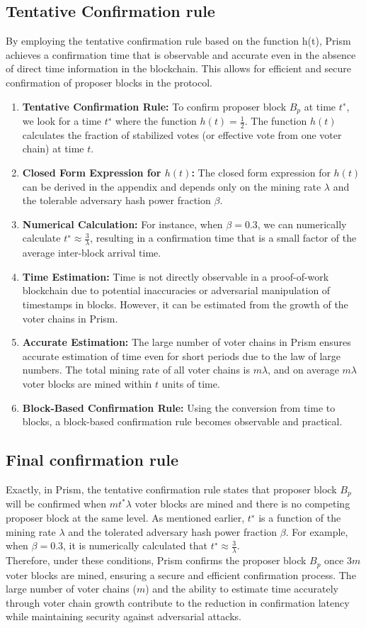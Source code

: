 \documentclass{report}
\begin{document}
\subsection{Tentative Confirmation rule}
By employing the tentative confirmation rule based on the function h(t), Prism achieves a confirmation time that is observable and accurate even in the absence of direct time information in the blockchain. This allows for efficient and secure confirmation of proposer blocks in the protocol.\\
\begin{enumerate}
	\item \textbf{Tentative Confirmation Rule:}  To confirm proposer block $B_{p}$ at time $t^{∗}$, we look for a time $t^{∗}$ where the function $h(t) = \frac{1}{2}$. The function $h(t)$ calculates the fraction of stabilized votes (or effective vote from one voter chain) at time $t$.
	\item \textbf{Closed Form Expression for $h(t)$:} The closed form expression for $h(t)$ can be derived in the appendix and depends only on the mining rate $\lambda$ and the tolerable adversary hash power fraction $\beta$.
	\item \textbf{Numerical Calculation:} For instance, when $\beta = 0.3$, we can numerically calculate $t^{∗} ≈ \frac{3}{\lambda}$, resulting in a confirmation time that is a small factor of the average inter-block arrival time.
	\item \textbf{Time Estimation:} Time is not directly observable in a proof-of-work blockchain due to potential inaccuracies or adversarial manipulation of timestamps in blocks. However, it can be estimated from the growth of the voter chains in Prism.
	\item \textbf{Accurate Estimation:} The large number of voter chains in Prism ensures accurate estimation of time even for short periods due to the law of large numbers. The total mining rate of all voter chains is $m\lambda$, and on average $m\lambda$ voter blocks are mined within $t$ units of time.
	\item \textbf{Block-Based Confirmation Rule:} Using the conversion from time to blocks, a block-based confirmation rule becomes observable and practical.
\end{enumerate}
\subsection{Final confirmation rule}
Exactly, in Prism, the tentative confirmation rule states that proposer block $B_{p}$ will be confirmed when $mt^{*}\lambda$ voter blocks are mined and there is no competing proposer block at the same level. As mentioned earlier, $t^{∗}$ is a function of the mining rate $\lambda$ and the tolerated adversary hash power fraction $\beta$. For example, when $\beta = 0.3$, it is numerically calculated that $t^{∗} ≈ \frac{3}{\lambda}$.\\
Therefore, under these conditions, Prism confirms the proposer block $B_{p}$ once $3m$ voter blocks are mined, ensuring a secure and efficient confirmation process. The large number of voter chains ($m$) and the ability to estimate time accurately through voter chain growth contribute to the reduction in confirmation latency while maintaining security against adversarial attacks.
\end{document}
